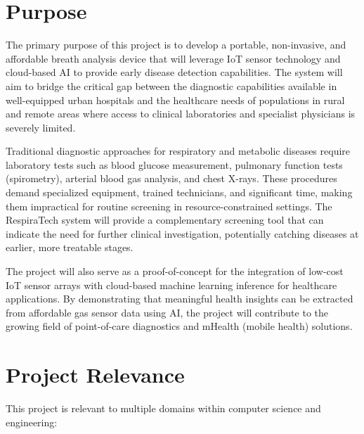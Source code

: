\section{Purpose}
The primary purpose of this project is to develop a portable, non-invasive, and affordable breath analysis device that will leverage IoT sensor technology and cloud-based AI to provide early disease detection capabilities. The system will aim to bridge the critical gap between the diagnostic capabilities available in well-equipped urban hospitals and the healthcare needs of populations in rural and remote areas where access to clinical laboratories and specialist physicians is severely limited.

Traditional diagnostic approaches for respiratory and metabolic diseases require laboratory tests such as blood glucose measurement, pulmonary function tests (spirometry), arterial blood gas analysis, and chest X-rays. These procedures demand specialized equipment, trained technicians, and significant time, making them impractical for routine screening in resource-constrained settings. The RespiraTech system will provide a complementary screening tool that can indicate the need for further clinical investigation, potentially catching diseases at earlier, more treatable stages.

The project will also serve as a proof-of-concept for the integration of low-cost IoT sensor arrays with cloud-based machine learning inference for healthcare applications. By demonstrating that meaningful health insights can be extracted from affordable gas sensor data using AI, the project will contribute to the growing field of point-of-care diagnostics and mHealth (mobile health) solutions.

\section{Project Relevance}
This project is relevant to multiple domains within computer science and engineering:

